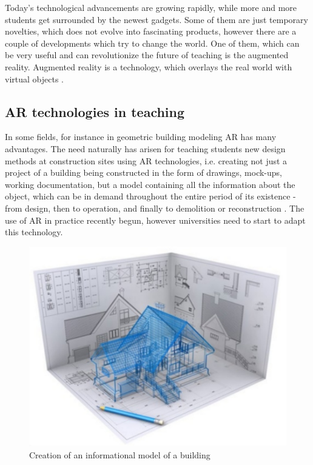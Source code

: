 \documentclass[10pt,oneside,english,a4paper]{article}
\begin{document}
	Today's technological advancements are growing rapidly, while more and more students get surrounded by the newest gadgets. Some of them are just temporary novelties, which does not evolve into fascinating products, however there are a couple of developments which try to change the world. One of them, which can be very useful and can revolutionize the future of teaching is the augmented reality. Augmented reality is a technology, which overlays the real world with virtual objects \cite{Tretyakova2019}.


\subsection{AR technologies in teaching}\label{5.2}

	 In some fields, for instance in geometric building modeling AR has many advantages. The need naturally has arisen for teaching students new design methods at construction sites using AR technologies, i.e. creating not just a project of a building being constructed in the form of drawings, mock-ups, working documentation, but a model containing all the information about the object, which can be in demand throughout the entire period of its existence - from design, then to operation, and finally to demolition or reconstruction \cite{Tretyakova2019}. The use of AR in practice recently begun, however universities need to start to adapt this technology. 

\begin{figure}[tbh!]
\centering
\includegraphics[scale=.6]{ar_tech.pdf}
\caption{Creation of an informational model of a building\cite{Tretyakova2019}}
\label{f:rozhod}
\end{figure}
\end{document}
